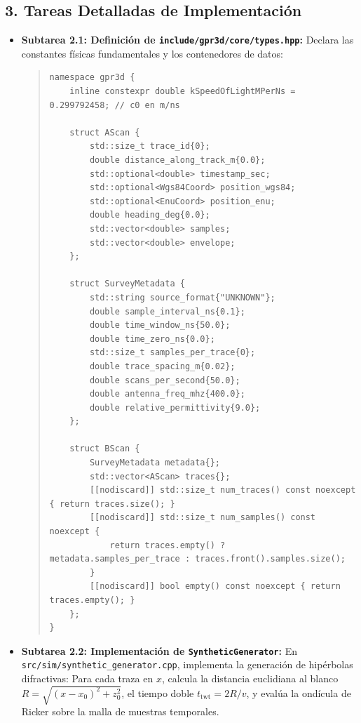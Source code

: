 \documentclass[11pt,a4paper]{article}
\begin{document}
\subsection{3. Tareas Detalladas de Implementación}
\begin{itemize}
    \item \textbf{Subtarea 2.1: Definición de \texttt{include/gpr3d/core/types.hpp}:}
    Declara las constantes físicas fundamentales y los contenedores de datos:
\begin{quote}
\small
\begin{verbatim}
namespace gpr3d {
    inline constexpr double kSpeedOfLightMPerNs = 0.299792458; // c0 en m/ns

    struct AScan {
        std::size_t trace_id{0};
        double distance_along_track_m{0.0};
        std::optional<double> timestamp_sec;
        std::optional<Wgs84Coord> position_wgs84;
        std::optional<EnuCoord> position_enu;
        double heading_deg{0.0};
        std::vector<double> samples;
        std::vector<double> envelope;
    };

    struct SurveyMetadata {
        std::string source_format{"UNKNOWN"};
        double sample_interval_ns{0.1};
        double time_window_ns{50.0};
        double time_zero_ns{0.0};
        std::size_t samples_per_trace{0};
        double trace_spacing_m{0.02};
        double scans_per_second{50.0};
        double antenna_freq_mhz{400.0};
        double relative_permittivity{9.0};
    };

    struct BScan {
        SurveyMetadata metadata{};
        std::vector<AScan> traces{};
        [[nodiscard]] std::size_t num_traces() const noexcept { return traces.size(); }
        [[nodiscard]] std::size_t num_samples() const noexcept {
            return traces.empty() ? metadata.samples_per_trace : traces.front().samples.size();
        }
        [[nodiscard]] bool empty() const noexcept { return traces.empty(); }
    };
}
\end{verbatim}
\end{quote}

    \item \textbf{Subtarea 2.2: Implementación de \texttt{SyntheticGenerator}:}
    En \texttt{src/sim/synthetic\_generator.cpp}, implementa la generación de hipérbolas difractivas:
    Para cada traza en $x$, calcula la distancia euclidiana al blanco $R = \sqrt{(x - x_0)^2 + z_0^2}$, el tiempo doble $t_{\text{twt}} = 2R / v$, y evalúa la ondícula de Ricker sobre la malla de muestras temporales.
\end{itemize}
\end{document}
